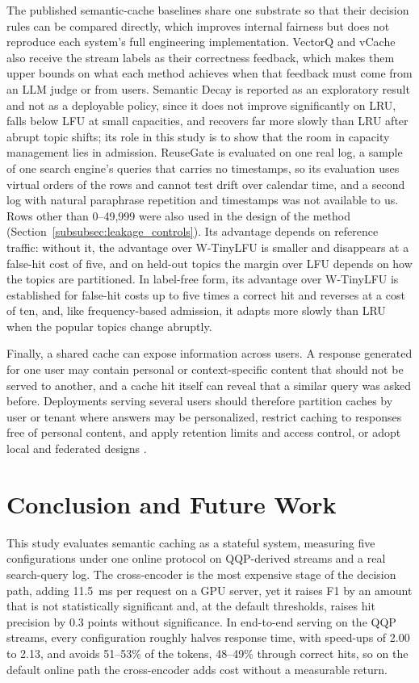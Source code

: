 \documentclass[authoryear,preprint,review,12pt]{elsarticle}
\begin{document}
The published semantic-cache baselines share one substrate so that their decision rules can be compared directly, which improves internal fairness but does not reproduce each system's full engineering implementation. VectorQ and vCache also receive the stream labels as their correctness feedback, which makes them upper bounds on what each method achieves when that feedback must come from an LLM judge or from users. Semantic Decay is reported as an exploratory result and not as a deployable policy, since it does not improve significantly on LRU, falls below LFU at small capacities, and recovers far more slowly than LRU after abrupt topic shifts; its role in this study is to show that the room in capacity management lies in admission. ReuseGate is evaluated on one real log, a sample of one search engine's queries that carries no timestamps, so its evaluation uses virtual orders of the rows and cannot test drift over calendar time, and a second log with natural paraphrase repetition and timestamps was not available to us. Rows other than 0--49,999 were also used in the design of the method (Section~\ref{subsubsec:leakage_controls}). Its advantage depends on reference traffic: without it, the advantage over W-TinyLFU is smaller and disappears at a false-hit cost of five, and on held-out topics the margin over LFU depends on how the topics are partitioned. In label-free form, its advantage over W-TinyLFU is established for false-hit costs up to five times a correct hit and reverses at a cost of ten, and, like frequency-based admission, it adapts more slowly than LRU when the popular topics change abruptly.

Finally, a shared cache can expose information across users. A response generated for one user may contain personal or context-specific content that should not be served to another, and a cache hit itself can reveal that a similar query was asked before. Deployments serving several users should therefore partition caches by user or tenant where answers may be personalized, restrict caching to responses free of personal content, and apply retention limits and access control, or adopt local and federated designs \citep{kim2025overview,li2025survey}.

\section{Conclusion and Future Work}
\label{sec:conclusion}
This study evaluates semantic caching as a stateful system, measuring five configurations under one online protocol on QQP-derived streams and a real search-query log. The cross-encoder is the most expensive stage of the decision path, adding 11.5~ms per request on a GPU server, yet it raises F1 by an amount that is not statistically significant and, at the default thresholds, raises hit precision by 0.3 points without significance. In end-to-end serving on the QQP streams, every configuration roughly halves response time, with speed-ups of 2.00 to 2.13, and avoids 51--53\% of the tokens, 48--49\% through correct hits, so on the default online path the cross-encoder adds cost without a measurable return.
\end{document}
